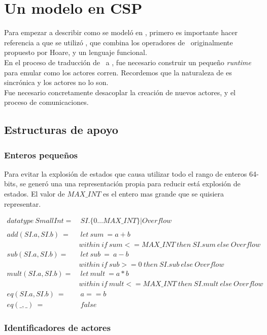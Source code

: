 \chapter{Un modelo en CSP}
Para empezar a describir como se modeló en \CSP, primero es importante hacer
referencia a que se utilizó \CSPm \cite{fdr}, que combina los operadores de \CSP\ 
originalmente propuesto por Hoare\cite{Hoare:1978:CSP:359576.359585}, y un lenguaje funcional. \\
En el proceso de traducción de \SAL\ a \CSPm, fue necesario construir un pequeño
\textit{runtime} para emular como los actores corren. Recordemos que la
naturaleza de \CSP es sincrónica y los actores no lo son. \\
Fue necesario concretamente desacoplar la creación de nuevos actores, y el proceso de comunicaciones. 

\section{Estructuras de apoyo}

\subsection{Enteros pequeños}

Para evitar la explosión de estados que causa utilizar todo el rango de enteros 64-bits, se generó una
una representación propia para reducir está explosión de estados. El valor de $MAX\_INT$ es el entero mas grande que se quisiera representar.

\begin{align*}
datatype\ SmallInt =&\ SI.\{0 \ldots MAX\_INT\} | Overflow \\
\\
add(SI.a, SI.b)\ =&\ let\ sum\ = a + b \\
&within\ if\ sum <= MAX\_INT\ then\ SI.sum\ else\ Overflow  \\
%
sub(SI.a, SI.b) =&\ let\ sub\ =\ a - b \\
& within\ if\ sub >= 0\ then\ SI.sub\ else\ Overflow \\
%
mult(SI.a, SI.b) =&\ let\ mult\ = a * b \\
& within\ if\ mult <= MAX\_INT\ then\ SI.mult\ else\ Overflow \\
eq(SI.a, SI.b)\ =&\ a == b \\
eq(\_, \_)\ =&\ false
\end{align*}

\subsection{Identificadores de actores}

